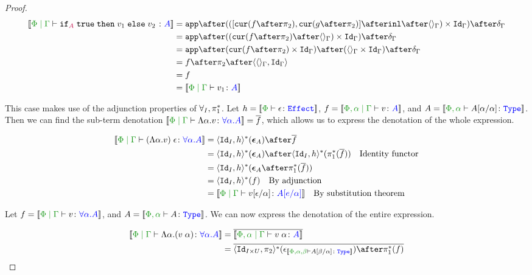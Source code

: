 \documentclass{Report}
\begin{document}
\begin{framed}
\begin{proof}
    \begin{equation}
        \begin{split}
            \deno{\gpetyperelation{\pifthenelse{A}{\t}{v_1}{v_2}}{A}} & = \ifMorph{\inl\after\term{\G}}{f}{g} \\
            & = \app\after((\cur{f\after\pp}\after\term{\G})\times\idg)\after\diag{\G}\\
            & = \app\after(\cur{f\after\pp}\times\idg)\after(\term{\G}\times\idg)\after\diag{\G}\\
            & = f\after\pp\after\pr{\term{\G}}{\idg}\\
            & = f \\
            & = \deno{\gpetyperelation{v_1}{A}}\\
        \end{split}
    \end{equation}
    
    \case{\eqeffbeta}
    This case makes use of the adjunction properties of $\forall_I, \pi_1^*$. Let  $h = \deno{\typerelation{\P}{\e}{\effect}}$, $f = \deno{\etyperelation{\P,\a}{\G}{v}{A}}$, and $A = \deno{\typerelation{\P,\a}{A\ssub{\a}{\a}}{\type}}$. Then we can find the sub-term denotation $\deno{\gpetyperelation{\elam{\a}{v}}{\all{\a}{A}}} = \bar{f}$, which allows us to express the denotation of the whole expression.
    
    \begin{align*}
        \deno{\gpetyperelation{\eapp{(\elam{\a}{v})}{\e}}{\all{\a}{A}}} & = \pr{\Id{I}}{h}\star(\counit{A})\after\bar{f}\\
        & = \pr{\Id{I}}{h}\star(\counit{A})\after\pr{\Id{I}}{h}\star(\pstar(\bar{f}))\qt{Identity functor}\\
        &= \pr{\Id{I}}{h}\star(\counit{A}\after\pstar(\bar{f}))\\
        &= \pr{\Id{I}}{h}\star(f)\qt{By adjunction}\\
        &= \deno{\gpetyperelation{v\ssub{\a}{\e}}{A\ssub{\a}{e}}}\qt{By substitution theorem}\\
    \end{align*}
    
    \case{\eqeffeta}
        Let $f  = \deno{\gpetyperelation{v}{\all{\a}{A}}}$, and $A  = \deno{\typerelation{\P,\a}{A}{\type}}$. We can now express the denotation of the entire expression.
    
        \begin{align*}
            \deno{\gpetyperelation{\elam{\a}{(\eapp{v}{\a})}}{\all{\a}{A}}} & = \bar{\deno{\etyperelation{\P,\a}{\G}{\eapp{v}{\a}}{A}}} \\
            & = \bar{\pr{\Id{I\times U}}{\pp}\star(\e_{\deno{\typerelation{\P,\a,\b}{A\ssub{\a}{\b}}{\type}}})\after\pstar(f)}
        \end{align*}
    

\end{proof}
\end{framed}
\end{document}
